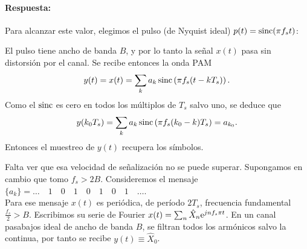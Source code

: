 \paragraph{Respuesta:}
\begin{center}
\end{center}

Para alcanzar este valor, elegimos el pulso (de Nyquist ideal)
$p(t)= \operatorname{sinc} (\pi f_s t)$:

\begin{center}\begin{minipage}{\textwidth}
    \endpgfgraphicnamed

    \endpgfgraphicnamed\end{minipage}
\end{center}
El pulso tiene ancho de banda $B$, y por lo tanto la señal $x(t)$
pasa sin distorsión por el canal. Se recibe entonces la onda PAM
\[y(t)=x(t)=\sum_k a_k \operatorname{sinc} \left(\pi f_s (t-kT_s)\right).\]
Como el $\operatorname{sinc}$ es cero en todos los múltiplos de $T_s$ salvo
uno, se deduce que
\[y(k_0 T_s) = \sum_k a_k \operatorname{sinc}\left(\pi f_s (k_0-k)T_s\right) = a_{k_0}.\]
Entonces el muestreo de $y(t)$ recupera los símbolos.

Falta ver que esa velocidad de señalización no se puede superar.
Supongamos en cambio que tomo $f_s > 2B$. Consideremos el mensaje
$\{a_k\} = \ldots \quad 1 \quad 0 \quad 1 \quad 0 \quad 1\quad 0
\quad 1\quad \ldots$. \\
Para ese mensaje $x(t)$ es periódica, de período $2T_s$,
frecuencia fundamental $\frac{f_s}{2} > B$. Escribimos su serie de
Fourier  $x(t) = \sum_n \hat{X}_n\mathrm{e}^{jnf_s\pi t}$. En un canal
pasabajos ideal de ancho de banda $B$, se filtran todos los
armónicos salvo la continua, por tanto se recibe $y(t) \equiv
\hat{X}_0$.

